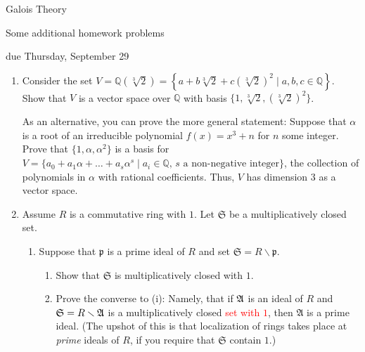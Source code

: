 \documentclass[11pt]{report}
\newcommand\QQ{\mathbb Q}
\newcommand\gen{\sqrt[3]{2}}
\begin{document}
\thispagestyle{empty}

\begin{center}
{\sc Galois Theory

\smallskip

Some additional homework problems

\smallskip

due Thursday, September 29}

\end{center}

\bigskip

\begin{enumerate}

\item Consider the set $V = \QQ(\gen) = \left\{ a + b \gen + c {(\gen)}^2 \mid a, b, c \in \QQ \right\}$.
Show that $V$ is a vector space over $\QQ$ with basis $\{1, \gen, {(\gen)}^2 \}$.

\smallskip

As an alternative, you can prove the more general statement:  Suppose that $\alpha$ is a root 
of an irreducible polynomial $f(x) = x^3 + n$ for $n$ some integer.   Prove that $\{1, \alpha,
\alpha^2 \}$ is a basis for $V = \{ a_0 + a_1 \alpha + \dots + a_s \alpha^s \mid a_i \in \QQ, \, 
s \text{ a non-negative integer} \}$,
the collection of polynomials in $\alpha$ with rational coefficients.  Thus, $V$ has
dimension $3$ as a vector space.

\item Assume $R$ is a commutative ring with $1$.  Let $\mathfrak{S}$ be a multiplicatively
closed set.  

\begin{enumerate}

\item Suppose that $\mathfrak{p}$ is a prime ideal of $R$ and set $\mathfrak{S} = 
R \smallsetminus \mathfrak{p}$.

\begin{enumerate}

\item Show that $\mathfrak S$ is multiplicatively closed with $1$.

\item Prove the converse to (i):  Namely, that if $\frak A$ is an ideal of
$R$ and $\mathfrak S = R \smallsetminus \frak{A}$ is a multiplicatively
closed \textcolor{red}{set with $1$}, then $\mathfrak{A}$ is a prime ideal.
(The upshot of this is that localization of rings takes place at
\emph{prime} ideals of $R$, if you require that $\mathfrak S$ contain
$1$.)


\end{enumerate}
\end{enumerate}
\end{enumerate}
\end{document}
